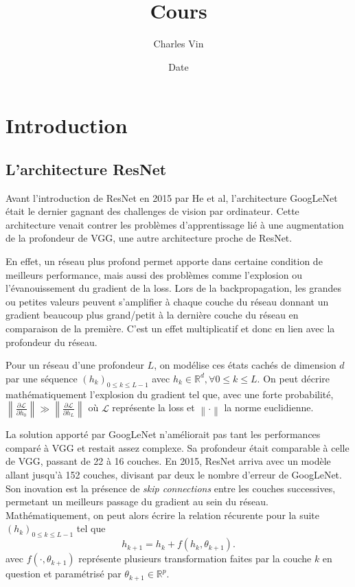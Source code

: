 \documentclass{report}
\title{Cours}
\author{Charles Vin}
\date{Date}
\theoremstyle{plain}%
\theoremstyle{definition}
\theoremstyle{remark}
\begin{document}
\chapter{Introduction}
\section{L'architecture ResNet}
Avant l'introduction de ResNet en 2015 par He et al, l'architecture GoogLeNet était le dernier gagnant des challenges de vision par ordinateur. Cette architecture venait contrer les problèmes d'apprentissage lié à une augmentation de la profondeur de VGG, une autre architecture proche de ResNet. 

En effet, un réseau plus profond permet apporte dans certaine condition de meilleurs performance, mais aussi des problèmes comme l'explosion ou l'évanouissement du gradient de la loss. Lors de la backpropagation, les grandes ou petites valeurs peuvent s'amplifier à chaque couche du réseau donnant un gradient beaucoup plus grand/petit à la dernière couche du réseau en comparaison de la première. C'est un effet multiplicatif et donc en lien avec la profondeur du réseau.

Pour un réseau d'une profondeur $ L $, on modélise ces états cachés de dimension $ d $  par une séquence $ (h_k)_{0 \leq k \leq L - 1} $ avec $ h_k \in \mathbb{R}^d, \forall 0 \leq k \leq L $. On peut décrire mathématiquement l'explosion du gradient tel que, avec une forte probabilité, $ \left\| \frac{\partial \mathcal{L}}{\partial h_0} \right\|  \gg  \left\| \frac{\partial \mathcal{L}}{\partial h_L} \right\|  $ où $ \mathcal{L} $ représente la loss et $ \left\| \cdot  \right\|  $ la norme euclidienne.

La solution apporté par GoogLeNet n'améliorait pas tant les performances comparé à VGG et restait assez complexe. Sa profondeur était comparable à celle de VGG, passant de 22 à 16 couches. En 2015, ResNet arriva avec un modèle allant jusqu'à 152 couches, divisant par deux le nombre d'erreur de GoogLeNet. Son inovation est la présence de \textit{skip connections} entre les couches successives, permetant un meilleurs passage du gradient au sein du réseau. Mathématiquement, on peut alors écrire la relation récurente pour la suite $ (h_k)_{0 \leq k \leq L - 1} $ tel que 
\[
    h_{k+1 } = h_k + f(h_k, \theta _{k+1})
.\]
avec $ f(\cdot , \theta _{k+1}) $ représente plusieurs transformation faites par la couche $ k $ en question et paramétrisé par $ \theta _{k+1} \in \mathbb{R}^p $.
\end{document}
